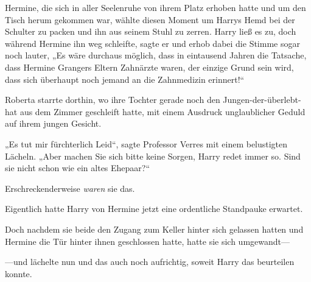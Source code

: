 Hermine, die sich in aller Seelenruhe von ihrem Platz erhoben hatte und um den Tisch herum gekommen war, wählte diesen Moment um Harrys Hemd bei der Schulter zu packen und ihn aus seinem Stuhl zu zerren. Harry ließ es zu, doch während Hermine ihn weg schleifte, sagte er und erhob dabei die Stimme sogar noch lauter, „Es wäre durchaus möglich, dass in eintausend Jahren die Tatsache, dass Hermine Grangers Eltern Zahnärzte waren, der einzige Grund sein wird, dass sich überhaupt noch jemand an die Zahnmedizin erinnert!“

\later

Roberta starrte dorthin, wo ihre Tochter gerade noch den Jungen-der-überlebt-hat aus dem Zimmer geschleift hatte, mit einem Ausdruck unglaublicher Geduld auf ihrem jungen Gesicht.

„Es tut mir fürchterlich Leid“, sagte Professor Verres mit einem belustigten Lächeln. „Aber machen Sie sich bitte keine Sorgen, Harry redet immer so. Sind sie nicht schon wie ein altes Ehepaar?“

Erschreckenderweise \emph{waren} sie das.

\later

Eigentlich hatte Harry von Hermine jetzt eine ordentliche Standpauke erwartet.

Doch nachdem sie beide den Zugang zum Keller hinter sich gelassen hatten und Hermine die Tür hinter ihnen geschlossen hatte, hatte sie sich umgewandt—

—und lächelte nun und das auch noch aufrichtig, soweit Harry das beurteilen konnte.

